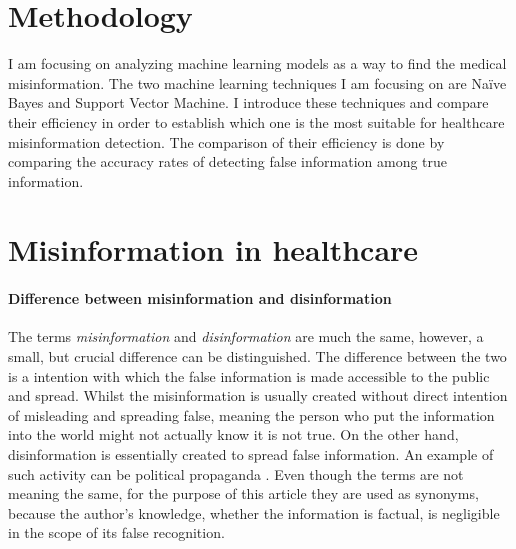 \documentclass[11pt ,english,a4paper]{article}
\begin{document}
\section{Methodology}

I am focusing on analyzing machine learning models as a way to find the medical misinformation. The two machine learning techniques I am focusing on are Naïve Bayes and Support Vector Machine. I introduce these techniques and compare their efficiency in order to establish which one is the most suitable for healthcare misinformation detection. The comparison of their efficiency is done by comparing the accuracy rates of detecting false information among true information. 

\section{Misinformation in healthcare}\label{mih}

\paragraph{Difference between misinformation and disinformation}
The terms \emph{misinformation} and \emph{disinformation} are much the same, however, a small, but crucial difference can be distinguished. The difference between the two is a intention with which the false information is made accessible to the public and spread. Whilst the misinformation is usually created without direct intention of misleading and spreading false, meaning the person who put the information into the world might not actually know it is not true. On the other hand, disinformation is essentially created to spread false information. An example of such activity can be political propaganda \cite{gu20misinfo} \cite{cook15misinfo}. Even though the terms are not meaning the same, for the purpose of this article they are used as synonyms, because the author's knowledge, whether the information is factual, is negligible in the scope of its false recognition.

\end{document}
